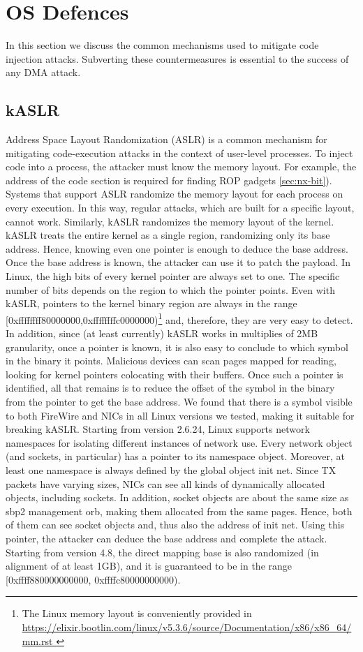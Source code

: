 \section{OS Defences}
In this section we discuss the common mechanisms used to mitigate code injection attacks. Subverting these countermeasures is essential to the success of any DMA attack.
\subsection{kASLR}
Address Space Layout Randomization (ASLR) is a common mechanism for mitigating code-execution attacks in the context of user-level processes. To inject code into a process, the attacker must know the memory layout. For example, the address of the code section is required for finding ROP gadgets \ref{sec:nx-bit}). Systems that support ASLR randomize the memory layout for each process on every execution. In this way, regular attacks, which are built for a specific layout, cannot work. Similarly, kASLR \cite{kalsr} randomizes the memory layout of the kernel. kASLR treats the entire kernel as a single region, randomizing only its base address. Hence, knowing even one pointer is enough to deduce the base address. Once the base address is known, the attacker can use it to patch the payload. In Linux, the high bits of every kernel pointer are always set to one. The specific number of bits depends on the region to which the pointer points. Even with kASLR, pointers to the kernel binary region are always in the range [0xffffffff80000000,0xffffffffc0000000)\footnote{The Linux memory layout is conveniently provided in 
\url{ https://elixir.bootlin.com/linux/v5.3.6/source/Documentation/x86/x86_64/mm.rst }
} and, therefore, they are very easy to detect. In addition, since (at least currently) kASLR works in multiplies of 2MB granularity, once a pointer is known, it is also easy to conclude to which symbol in the binary it points. Malicious devices can scan pages mapped for reading, looking for kernel pointers colocating with their buffers. Once such a pointer is identified, all that remains is to reduce the offset of the symbol in the binary from the pointer to get the base address. We found that there is a symbol visible to both FireWire and NICs in all Linux versions we tested, making it suitable for breaking kASLR. Starting from version 2.6.24, Linux supports network namespaces for isolating different instances of network use. 
\newline 
Every network object (and sockets, in particular) has a pointer to its namespace object. Moreover, at least one namespace is always defined by the global object init net. Since TX packets have varying sizes, NICs can see all kinds of dynamically allocated objects, including sockets. In addition, socket objects are about the same size as sbp2 management orb, making them allocated from the same pages. Hence, both of them can see socket objects and, thus also the address of init net. Using this pointer, the attacker can deduce the base address and complete the attack. Starting from version 4.8, the direct mapping base is also randomized (in alignment of at least 1GB), and it is guaranteed to be in the range [0xffff880000000000, 0xffffc80000000000).

